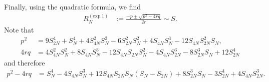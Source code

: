\documentclass[english, parskip=full]{scrartcl}
\newcommand{\kla}{}
\newcommand{\tecxt}{}
\begin{document}
Finally, using the quadratic formula, we find 
\begin{align}
R_N^{(\tecxt\text{exp.1})} &:= \frac{-p \pm \sqrt{p^2 - 4rq}}{2r} \sim S.
\end{align}
Note that
\begin{align}
p^2 &= 9S_{2N}^4 + S_N^4 + 4S_{4N}^2S_N^2 - 6S_{2N}^2S_N^2 + 4S_{4N}S_N^3 - 12S_{4N}S_{2N}^2S_N,\\
4rq &= 4S_{4N}^2S_N^2 + 8S_{4N}S_N^3 - 12S_{4N}S_{2N}S_N^2 - 4S_{4N}S_{2N}^3 - 8S_{2N}^3S_N + 12S_{2N}^4
\end{align}
and therefore
\begin{align}
p^2 - 4rq &= S_N^4 - 4S_{4N}S_N^3 + 12S_{4N}S_{2N}S_N( S_N - S_{2N}) + 8S_{2N}^3S_N - 3S_{2N}^4 + 4S_{4N}S_{2N}^3.
\end{align}



\end{document}
